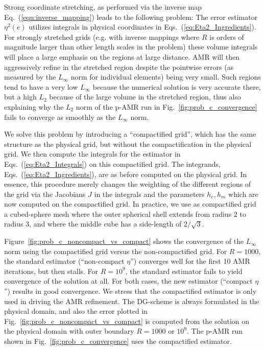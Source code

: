   Strong coordinate stretching, as performed via the inverse map Eq.~(\ref{eqn:inverse_mapping}) leads to the following problem:
 The error estimator $\eta^2(e)$ utilizes integrals in
  physical coordinates in Eqs.~(\ref{eq:Eta2_Ingredients}).  For
  strongly stretched grids (e.g. with inverse mappings where $R$ is
  orders of magnitude larger than other length scales in the problem)
  these volume integrals will place a large emphasis on the regions at
  large distance.  AMR will then aggressively refine in the stretched
region despite the pointwise errors (as measured by the $L_\infty$ norm for individual elements) being very small.
Such regions tend to have a very low $L_\infty$ because the numerical solution is very
accurate there, but a high $L_2$ because of the large volume in the stretched region, thus also explaining why the $L_2$ norm of the p-AMR run in Fig.~\ref{fig:prob_c_convergence} fails to converge as smoothly as the $L_\infty$ norm.

We solve this problem by introducing a ``compactified grid'',
which has the same structure as the physical grid, but without the
compactification in the physical grid.  We then compute the integrals for the estimator in
Eqs.~(\ref{eq:Eta2_Integrals}) on this compactified grid.  The
integrands, Eqs.~(\ref{eq:Eta2_Ingredients}), are as before computed
on the physical grid.  In essence, this procedure merely changes the
weighting of the different regions of the grid via the Jacobians $J$
in the integrals and the parameters $h_e, h_m$ which are now computed on the compactified grid. 
In practice, we use as compactified grid
a cubed-sphere mesh where the outer spherical shell extends from radius $2$ to radius $3$, and where the middle cube has a side-length of $2/\sqrt{3}$. 


Figure~\ref{fig:prob_c_noncompact_vs_compact} shows the convergence of
the $L_\infty$ norm using the compactified grid versus the
non-compactified grid.  For $R = 1000$, the standard
  estimator (``non-compact $\eta$'') converges well for the first 10
  AMR iterations, but then stalls.  For $R=10^9$, the standard
  estimator fails to yield convergence of the solution at all.  For
  both cases, the new estimator (``compact $\eta$'') results in good
  convergence.  We stress that the compactified estimator is only used
  in driving the AMR refinement.  The DG-scheme is always formulated
  in the physical domain, and also the error plotted in
  Fig.~\ref{fig:prob_c_noncompact_vs_compact} is computed from the
  solution on the physical domain with outer boundary $R=1000$ or
  $10^9$.  The p-AMR run shown in Fig.~\ref{fig:prob_c_convergence}
  uses the compactified estimator.


